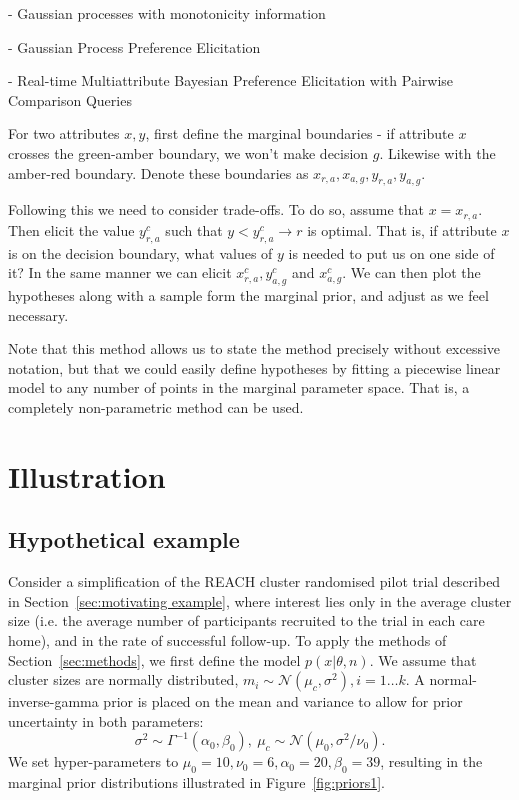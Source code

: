 \documentclass{article} %
\begin{document}
\cite{Riihimaeki2010} - Gaussian processes with monotonicity information

\cite{Guo2010} - Gaussian Process Preference Elicitation

\cite{Guo2010a} - Real-time Multiattribute Bayesian Preference Elicitation with Pairwise Comparison Queries

For two attributes $x, y$, first define the marginal boundaries - if attribute $x$ crosses the green-amber boundary, we won't make decision $g$. Likewise with the amber-red boundary. Denote these boundaries as $x_{r,a}, x_{a,g}, y_{r,a}, y_{a,g}$.

Following this we need to consider trade-offs. To do so, assume that $x = x_{r,a}$. Then elicit the value $y_{r,a}^{c}$ such that $y < y_{r,a}^{c} \rightarrow r$ is optimal. That is, if attribute $x$ is on the decision boundary, what values of $y$ is needed to put us on one side of it? In the same manner we can elicit $x_{r,a}^{c}, y_{a,g}^{c}$ and $x_{a,g}^{c}$. We can then plot the hypotheses along with a sample form the marginal prior, and adjust as we feel necessary.

Note that this method allows us to state the method precisely without excessive notation, but that we could easily define hypotheses by fitting a piecewise linear model to any number of points in the marginal parameter space. That is, a completely non-parametric method can be used.


\section{Illustration}\label{sec:illustration}

\subsection{Hypothetical example}

Consider a simplification of the REACH cluster randomised pilot trial described in Section~\ref{sec:motivating example}, where interest lies only in the average cluster size (i.e. the average number of participants recruited to the trial in each care home), and in the rate of successful follow-up. To apply the methods of Section~\ref{sec:methods}, we first define the model $p(x | \theta, n)$. We assume that cluster sizes are normally distributed, $m_{i} \sim \mathcal{N}(\mu_{c}, \sigma^{2}), i = 1 \ldots k$. A normal-inverse-gamma prior is placed on the mean and variance to allow for prior uncertainty in both parameters:
\begin{equation}
\sigma^{2} \sim \Gamma^{-1} (\alpha_{0}, \beta_{0}), ~ \mu_{c} \sim \mathcal{N}(\mu_{0}, \sigma^{2}/\nu_{0}).
\end{equation}
We set hyper-parameters to $\mu_{0} = 10, \nu_{0} = 6, \alpha_{0} = 20, \beta_{0} = 39$, resulting in the marginal prior distributions illustrated in Figure~\ref{fig:priors1}.
\end{document}

